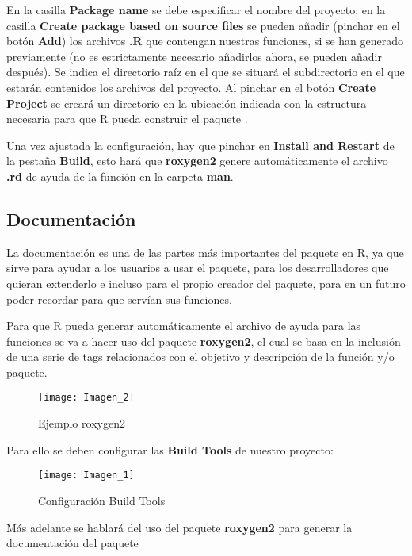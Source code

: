 En la casilla \textbf{Package name} se debe especificar el nombre del  proyecto; en la casilla
\textbf{Create package based on source files} se pueden a\~nadir (pinchar en el bot\'on \textbf{Add}) los
archivos \textbf{.R} que contengan nuestras funciones, si se han generado previamente (no es
estrictamente necesario a\~nadirlos ahora, se pueden a\~nadir despu\'es).
Se indica el directorio ra\'iz en el que se situar\'a el subdirectorio en el que estar\'an contenidos los archivos del proyecto. 
Al pinchar en el bot\'on \textbf{Create Project} se crear\'a un directorio en la ubicaci\'on indicada con la
estructura necesaria para que R pueda construir el paquete \cite{datavu}.

Una vez ajustada la configuraci\'on, hay que pinchar en \textbf{Install and Restart} de la pesta\~na \textbf{Build}, esto har\'a que \textbf{roxygen2} genere autom\'aticamente el archivo \textbf{.rd} de ayuda de la funci\'on en la carpeta \textbf{man}.

\subsection{Documentaci\'on}
La documentaci\'on es una de las partes m\'as importantes del paquete en R, ya que sirve para ayudar a los usuarios a usar el paquete, para los desarrolladores que quieran extenderlo e
incluso para el propio creador del paquete, para en un futuro poder recordar para que serv\'ian sus funciones.

Para que R pueda generar autom\'aticamente el archivo de ayuda para las funciones
se va a hacer uso del paquete \textbf{roxygen2}, el cual se basa en la inclusi\'on de una serie de tags relacionados con el objetivo y descripci\'on de la funci\'on y/o paquete. 


\begin{figure}[H]
    \centering
    \texttt{[image: Imagen\_2]}
    \caption{Ejemplo roxygen2   }
    \label{fig:roxygen}
\end{figure} 

Para ello se deben configurar las \textbf{Build Tools} de nuestro proyecto:

\begin{figure}[H]
    \centering
    \texttt{[image: Imagen\_1]}
    \caption{Configuraci\'on Build Tools }
    \label{fig:build_tools}
\end{figure} 

M\'as adelante se hablar\'a del uso del paquete \textbf{roxygen2} para generar la documentaci\'on del paquete

